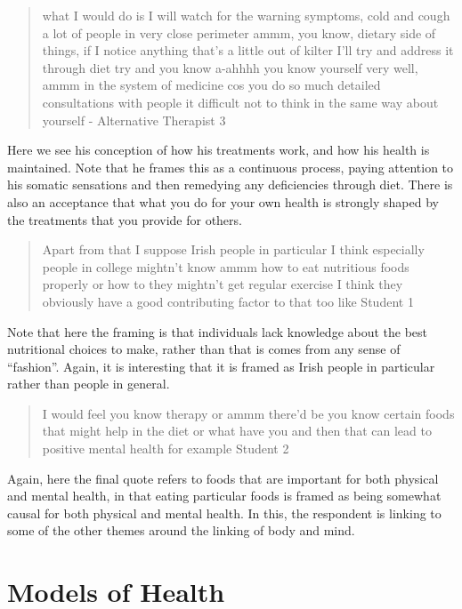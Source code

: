 \begin{quotation}
  what I would do is I will watch for the warning symptoms, cold and cough a lot of people in very close perimeter ammm, you know, dietary side of things, if I notice anything that's a little out of kilter I'll try and address it through diet try and you know a-ahhhh you know yourself very well, ammm in the system of medicine cos you do so much detailed consultations with people it difficult not to think in the same way about yourself - Alternative Therapist 3

\end{quotation}

Here we see his conception of how his treatments work, and how his health is maintained. Note that he frames this as a continuous process, paying attention to his somatic sensations and then remedying any deficiencies through diet. There is also an acceptance that what you do for your own health is strongly shaped by the treatments that you provide for others. 

\begin{quotation}
  Apart from that I suppose Irish people in particular I think especially people in college mightn't know ammm how to eat nutritious foods properly or how to they mightn't get regular exercise I think they obviously have a good contributing factor to that too like
Student 1
\end{quotation}


Note that here the framing is that individuals lack knowledge about the best nutritional choices to make, rather than that is comes from any sense of ``fashion''. Again, it is interesting that it is framed as Irish people in particular rather than people in general. 

\begin{quotation}
   I would feel you know therapy or ammm there'd be you know certain foods that might help in the diet or what have you and then that can lead to positive mental health for example
Student 2
\end{quotation}

Again, here the final quote refers to foods that are important for both physical and mental health, in that eating particular foods is framed as being somewhat causal for both physical and mental health. In this, the respondent is linking to some of the other themes around the linking of body and mind. 

\section{Models of Health}
\label{sec:models-health}

